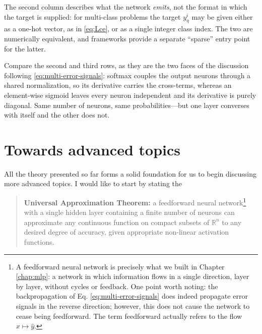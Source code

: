 \documentclass[11pt,a4paper,oneside]{book}
\theoremstyle{definition}
\theoremstyle{plain}
\theoremstyle{remark}
\begin{document}
\begin{table}[htbp]
\begin{flushleft}
  \vspace{0.3em}
  The second column describes what the network {\it emits}, not the format in which the target is supplied: for multi-class problems the target $y^i_\eta$ may be given either as a one-hot vector, as in \eqref{eq:Lce}, or as a single integer class index. The two are numerically equivalent, and frameworks provide a separate ``sparse'' entry point for the latter.

  \vspace{0.3em}
  Compare the second and third rows, as they are the two faces of the discussion following \eqref{eq:multi-error-signals}: softmax couples the output neurons through a shared normalization, so its derivative carries the cross-terms, whereas an element-wise sigmoid leaves every neuron independent and its derivative is purely diagonal. Same number of neurons, same probabilities---but one layer converses with itself and the other does not.
  \end{flushleft}
\end{table}



\chapter{Towards advanced topics}

All the theory presented so far forms a solid foundation for us to begin discussing more advanced topics. I would like to start by stating the

\begin{quote}
{\bf Universal Approximation Theorem:} a feedforward neural network\footnote{A feedforward neural network is precisely what we built in Chapter \ref{chap:mlp}: a network in which information flows in a single direction, layer by layer, without cycles or feedback. One point worth noting: the backpropagation of Eq. \eqref{eq:multi-error-signals} does indeed propagate error signals in the reverse direction; however, this does not cause the network to cease being feedforward. The term feedforward actually refers to the flow $x\mapsto\hat y$.} with a single hidden layer containing a finite number of neurons can approximate any continuous function on compact subsets of $\mathbb{R}^n$ to any desired degree of accuracy, given appropriate non-linear activation functions.
\end{quote}
\end{document}
